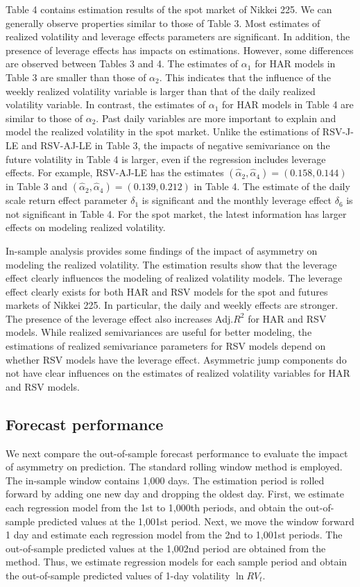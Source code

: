 \documentclass[10pt]{article}
\begin{document}
Table 4 contains estimation results of the spot market of Nikkei 225. 
We can generally observe properties similar to those of Table 3.  
Most estimates of realized volatility and leverage effects parameters are significant.  
In addition, the presence of leverage effects has impacts on estimations. 
However, some differences are observed between Tables 3 and 4. 
The estimates of $\alpha_1$ for HAR models in Table 3 are smaller than those of $\alpha_2$. 
This indicates that the influence of the weekly realized volatility variable is larger than that of the daily realized volatility variable.  
In contrast, the estimates of $\alpha_1$ for HAR models in Table 4 are similar to those of $\alpha_2$. 
Past daily variables are more important to explain and model the realized volatility in the spot market.   
Unlike the estimations of RSV-J-LE and RSV-AJ-LE in Table 3, 
the impacts of negative semivariance on the future volatility in Table 4 is larger, even if the regression includes leverage effects. 
For example, RSV-AJ-LE has the estimates $(\hat{\alpha}_2,\hat{\alpha}_4)=(0.158, 0.144)$ in Table 3 and $(\hat{\alpha}_2,\hat{\alpha}_4)=(0.139, 0.212)$ in Table 4. 
The estimate of the daily scale return effect parameter $\delta_1$ is significant and the monthly leverage effect $\delta_6$ is not significant in Table 4. 
For the spot market, the latest information has larger effects on modeling realized volatility. 

In-sample analysis provides some findings of the impact of asymmetry on modeling the realized volatility. 
The estimation results show that the leverage effect clearly influences the modeling of realized volatility models. 
The leverage effect clearly exists for both HAR and RSV models for the spot and futures markets of Nikkei 225. 
In particular, the daily and weekly effects are stronger. 
The presence of the leverage effect also increases Adj.$R^2$ for HAR and RSV models. 
While realized semivariances are useful for better modeling,   
the estimations of realized semivariance parameters for RSV models depend on whether RSV models have the leverage effect. 
Asymmetric jump components do not have clear influences on the estimates of realized volatility variables for HAR and RSV models.  



\subsection{Forecast performance}
We next compare the out-of-sample forecast performance to evaluate the impact of asymmetry on prediction. 
The standard rolling window method is employed. 
The in-sample window contains 1,000 days. 
The estimation period is rolled forward by adding one new day and dropping the oldest day. 
First, we estimate each regression model from the 1st to 1,000th periods, and obtain the out-of-sample predicted values at the 1,001st period. 
Next, we move the window forward 1 day and estimate each regression model from the 2nd to 1,001st periods. 
The out-of-sample predicted values at the 1,002nd period are obtained from the method.  
Thus, we estimate regression models for each sample period and obtain the out-of-sample predicted values of 1-day volatility $\ln RV_t$. 
\end{document}
